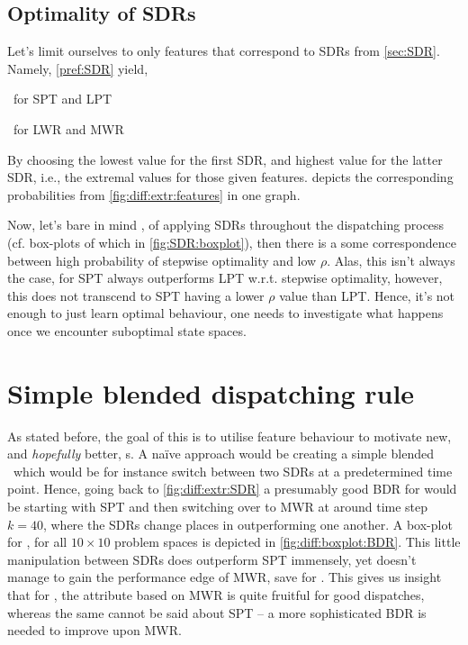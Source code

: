 \subsection{Optimality of SDRs}\label{sec:diff:opt:sdr}
Let's limit ourselves to only features that correspond to SDRs from 
\cref{sec:SDR}. Namely, \cref{pref:SDR} yield, 
\begin{enumerate*}
    \item \phiproc\ for SPT and LPT
    \item \phijobWrm\ for LWR and MWR 
\end{enumerate*}
By choosing the lowest value for the first SDR, and highest value for the 
latter SDR, i.e., the extremal values for those given features. 
 depicts the corresponding probabilities from 
\cref{fig:diff:extr:features} in one graph.

Now, let's bare in mind \namerho, of applying SDRs throughout the dispatching 
process (cf. box-plots of which in \cref{fig:SDR:boxplot}), then there is a 
some correspondence between high probability of stepwise optimality and low 
$\rho$. Alas, this isn't always the case, for  SPT always 
outperforms LPT w.r.t. stepwise optimality, however, this does not transcend to 
SPT having a lower $\rho$ value than LPT. Hence, it's not enough to just learn 
optimal behaviour, one needs to investigate what happens once we encounter 
suboptimal state spaces.

\section{Simple blended dispatching rule}\label{sec:diff:opt:bdr}
As stated before, the goal of this  is to 
utilise feature behaviour to motivate new, and \emph{hopefully} better, 
\dr s. 
A na\"ive approach would be creating a simple blended \dr\ which 
would be for instance switch between two SDRs at a predetermined time point. 
Hence, going back to \cref{fig:diff:extr:SDR} a presumably good BDR for 
  would be starting with SPT and then switching over to MWR at 
around time step $k=40$, where the SDRs change places in outperforming one 
another. A box-plot for \namerho, for all $10\times10$ problem spaces is 
depicted in \cref{fig:diff:boxplot:BDR}. This little manipulation between SDRs 
does outperform SPT immensely, yet doesn't manage to gain the performance edge 
of MWR, save for . This gives us insight that for \jsp, the 
attribute based on MWR is quite fruitful for good dispatches, whereas the same 
cannot be said about SPT -- a more sophisticated BDR is needed to improve upon 
MWR. 

